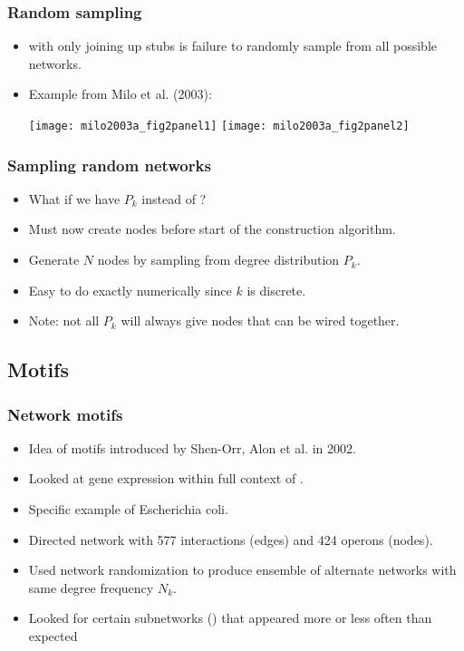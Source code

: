 \begin{frame}[label=]
  \frametitle{Random sampling}

  \begin{itemize}
  \item<1->  with only joining up stubs
    is \alert{failure} to randomly sample from all possible networks.
  \item<2-> Example from Milo et al. (2003)\cite{milo2003a}:
    \begin{overprint}
      \texttt{[image: milo2003a\_fig2panel1]}
      \texttt{[image: milo2003a\_fig2panel2]}
    \end{overprint}
  \end{itemize}

\end{frame}


\begin{frame}[label=]
  \frametitle{Sampling random networks}
  \begin{itemize}
  \item<1->
    What if we have \alert{$P_k$} instead of ?
  \item<2->
    Must now create nodes before start of the construction algorithm.
  \item<3->
    Generate $N$ nodes by sampling from degree distribution $P_k$.
  \item<4-> 
    Easy to do exactly numerically since $k$ is discrete.
  \item<5-> 
    \alert{Note:} not all $P_k$ will always give nodes
    that can be wired together.
  \end{itemize}
\end{frame}


\subsection{Motifs}

\begin{frame}[label=]
  \frametitle{Network motifs}

  \begin{itemize}
  \item<1-> 
    Idea of \alert{motifs}\cite{shen-orr2002a} 
    introduced by Shen-Orr, Alon et al. in 2002.
  \item<2-> 
    Looked at gene expression within full context of
    .
  \item<3-> 
    Specific example of Escherichia coli.
  \item<4-> 
    Directed network with 577 interactions (edges) and 424 operons (nodes).
  \item<5-> 
    Used network randomization to produce ensemble of alternate networks
    with same degree frequency $N_k$.
  \item<6-> 
    Looked for \alert{certain subnetworks} () that appeared more or less often than expected
  \end{itemize}
  
\end{frame}


